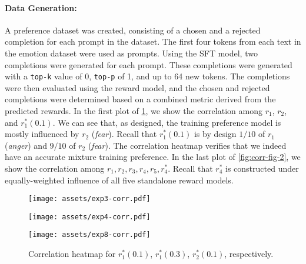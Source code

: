\paragraph{Data Generation:} A preference dataset was created, consisting of a chosen and a rejected completion for each prompt in the dataset. The first four tokens from each text in the emotion dataset were used as prompts. Using the SFT model, two completions were generated for each prompt. These completions were generated with a \texttt{top-k} value of 0, \texttt{top-p} of 1, and up to 64 new tokens. The completions were then evaluated using the reward model, and the chosen and rejected completions were determined based on a combined metric derived from the predicted rewards. In the first plot of \cref{fig:corr-fig-1}, we show the correlation among $r_1$, $r_2$, and $r_1^*(0.1)$. We can see that, as designed, the training preference model is mostly influenced by $r_2$ (\textit{fear}). Recall that $r_1^*(0.1)$ is by design $1/10$ of $r_1$ (\textit{anger}) and $9/10$ of $r_2$ (\textit{fear}). The correlation heatmap verifies that we indeed have an accurate mixture training preference. In the last plot of \cref{fig:corr-fig-2}, we show the correlation among $r_1,r_2,r_3,r_4,r_5,r^*_4$. Recall that $r_4^*$ is constructed under equally-weighted influence of all five standalone reward models.
\begin{figure}[!ht]
    \centering
    \begin{minipage}{0.32\textwidth}
        \centering
        \texttt{[image: assets/exp3-corr.pdf]}
        \label{fig:exp3-corr}
    \end{minipage}
    \hfill
    \begin{minipage}{0.32\textwidth}
        \centering
        \texttt{[image: assets/exp4-corr.pdf]}
        \label{fig:exp4-corr}
    \end{minipage}
    \hfill
    \begin{minipage}{0.32\textwidth}
        \centering
        \texttt{[image: assets/exp8-corr.pdf]}
        \label{fig:exp8-corr}
    \end{minipage}
    \caption{Correlation heatmap for $r^*_1(0.1)$, $r^*_1(0.3)$, $r^*_2(0.1)$, respectively.}
    \label{fig:corr-fig-1}
\end{figure}

